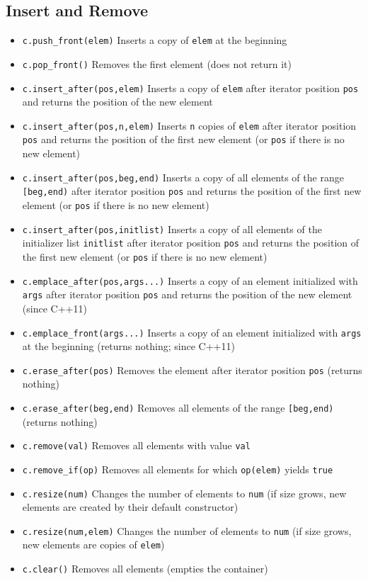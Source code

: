 \documentclass{report}
\begin{document}
\bigbreak \noindent 
\subsection{Insert and Remove}
\begin{itemize}
    \item \texttt{c.push\_front(elem)} Inserts a copy of \texttt{elem} at the beginning
    \item \texttt{c.pop\_front()} Removes the first element (does not return it)
    \item \texttt{c.insert\_after(pos,elem)} Inserts a copy of \texttt{elem} after iterator position \texttt{pos} and returns the position of the new element
    \item \texttt{c.insert\_after(pos,n,elem)} Inserts \texttt{n} copies of \texttt{elem} after iterator position \texttt{pos} and returns the position of the first new element (or \texttt{pos} if there is no new element)
    \item \texttt{c.insert\_after(pos,beg,end)} Inserts a copy of all elements of the range \texttt{[beg,end)} after iterator position \texttt{pos} and returns the position of the first new element (or \texttt{pos} if there is no new element)
    \item \texttt{c.insert\_after(pos,initlist)} Inserts a copy of all elements of the initializer list \texttt{initlist} after iterator position \texttt{pos} and returns the position of the first new element (or \texttt{pos} if there is no new element)
    \item \texttt{c.emplace\_after(pos,args...)} Inserts a copy of an element initialized with \texttt{args} after iterator position \texttt{pos} and returns the position of the new element (since C++11)
    \item \texttt{c.emplace\_front(args...)} Inserts a copy of an element initialized with \texttt{args} at the beginning (returns nothing; since C++11)
    \item \texttt{c.erase\_after(pos)} Removes the element after iterator position \texttt{pos} (returns nothing)
    \item \texttt{c.erase\_after(beg,end)} Removes all elements of the range \texttt{[beg,end)} (returns nothing)
    \item \texttt{c.remove(val)} Removes all elements with value \texttt{val}
    \item \texttt{c.remove\_if(op)} Removes all elements for which \texttt{op(elem)} yields \texttt{true}
    \item \texttt{c.resize(num)} Changes the number of elements to \texttt{num} (if size grows, new elements are created by their default constructor)
    \item \texttt{c.resize(num,elem)} Changes the number of elements to \texttt{num} (if size grows, new elements are copies of \texttt{elem})
    \item \texttt{c.clear()} Removes all elements (empties the container)
\end{itemize}
\end{document}
